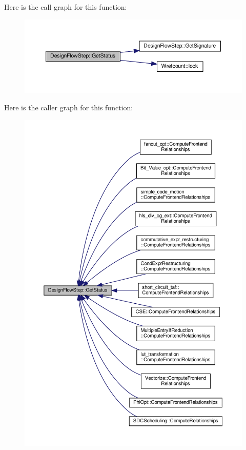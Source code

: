 Here is the call graph for this function\+:
\nopagebreak
\begin{figure}[H]
\begin{center}
\leavevmode
\includegraphics[width=350pt]{d3/da9/classDesignFlowStep_a489f53821a358e1d67dd0cfc042bd496_cgraph}
\end{center}
\end{figure}
Here is the caller graph for this function\+:
\nopagebreak
\begin{figure}[H]
\begin{center}
\leavevmode
\includegraphics[width=350pt]{d3/da9/classDesignFlowStep_a489f53821a358e1d67dd0cfc042bd496_icgraph}
\end{center}
\end{figure}
\mbox{\label{classDesignFlowStep_a1783abe0c1d162a52da1e413d5d1ef05}} 
